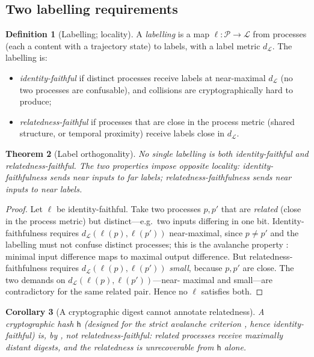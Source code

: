 \documentclass[twocolumn,10pt,a4paper]{article}
\theoremstyle{thmstyle}
\newtheorem{theorem}{Theorem}[section]
\newtheorem{corollary}[theorem]{Corollary}
\theoremstyle{definition}
\newtheorem{definition}[theorem]{Definition}
\theoremstyle{remark}
\newcommand{\dig}{\mathsf{h}}
\newcommand{\lab}{\ell}
\begin{document}
\subsection{Two labelling requirements}

\begin{definition}[Labelling; locality]
\label{def:label}
A \emph{labelling} is a map $\lab\colon\mathcal{P}\to\mathcal{L}$ from
processes (each a content with a trajectory state) to labels, with a
label metric $d_\mathcal{L}$. The labelling is:
\begin{itemize}[leftmargin=1.4em,itemsep=2pt]
\item \emph{identity-faithful} if distinct processes receive labels at
near-maximal $d_\mathcal{L}$ (no two processes are confusable), and
collisions are cryptographically hard to produce;
\item \emph{relatedness-faithful} if processes that are close in the
process metric (shared structure, or temporal proximity) receive labels
close in $d_\mathcal{L}$.
\end{itemize}
\end{definition}

\begin{theorem}[Label orthogonality]
\label{thm:orthogonality}
No single labelling is both identity-faithful and relatedness-faithful.
The two properties impose opposite locality: identity-faithfulness sends
near inputs to far labels; relatedness-faithfulness sends near inputs to
near labels.
\end{theorem}

\begin{proof}
Let $\lab$ be identity-faithful. Take two processes $p,p'$ that are
\emph{related} (close in the process metric) but distinct---e.g.\ two
inputs differing in one bit. Identity-faithfulness requires
$d_\mathcal{L}(\lab(p),\lab(p'))$ near-maximal, since $p\neq p'$ and the
labelling must not confuse distinct processes; this is the avalanche
property \citep{shannon1949,webster1986,feistel1973}: minimal input
difference maps to maximal output difference. But relatedness-faithfulness
requires $d_\mathcal{L}(\lab(p),\lab(p'))$ \emph{small}, because $p,p'$
are close. The two demands on $d_\mathcal{L}(\lab(p),\lab(p'))$---near-%
maximal and small---are contradictory for the same related pair. Hence no
$\lab$ satisfies both.
\end{proof}

\begin{corollary}[A cryptographic digest cannot annotate relatedness]
\label{cor:no-related}
A cryptographic hash $\dig$ (designed for the strict avalanche criterion
\citep{webster1986}, hence identity-faithful) is, by
, not relatedness-faithful: related processes
receive maximally distant digests, and the relatedness is unrecoverable
from $\dig$ alone.
\end{corollary}
\end{document}
